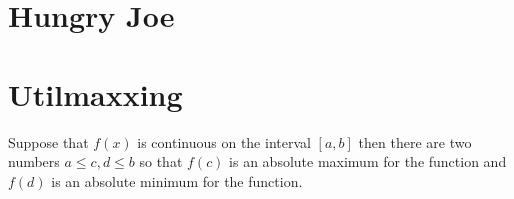 
\setcounter{chapter}{0}
\chapter{Hungry Joe}
\lipsum[2-4]

\setcounter{chapter}{1}
\chapter{Utilmaxxing}

\begin{theorem}
	Suppose that \(f\left( x \right)\) is continuous on the interval \(\left[ {a,b} \right]\) then there are two numbers \(a \le c,d \le b\) so that \(f\left( c \right)\) is an absolute maximum for the function and \(f\left( d \right)\) is an absolute minimum for the function.
\end{theorem}
